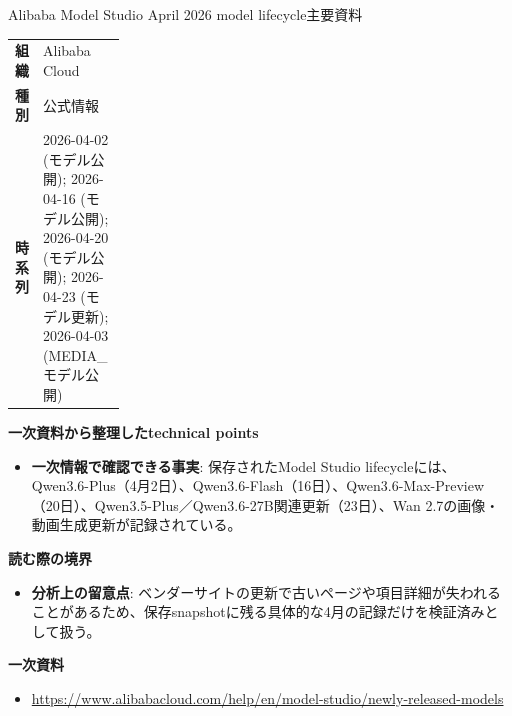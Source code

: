 \begin{technicalnote}{Alibaba Model Studio April 2026 model lifecycle}{主要資料}
\begingroup
\begin{tabularx}{\linewidth}{@{}>{\bfseries}p{0.22\linewidth}X@{}}
組織 & Alibaba Cloud \\
種別 & 公式情報 \\
時系列 & 2026-04-02 (モデル公開); 2026-04-16 (モデル公開); 2026-04-20 (モデル公開); 2026-04-23 (モデル更新); 2026-04-03 (MEDIA\_モデル公開) \\
\end{tabularx}
\smallskip
{\bfseries 一次資料から整理したtechnical points}
\begin{itemize}[leftmargin=1.5em,itemsep=0.35em]
\item \textbf{一次情報で確認できる事実}: 保存されたModel Studio lifecycleには、Qwen3.6-Plus（4月2日）、Qwen3.6-Flash（16日）、Qwen3.6-Max-Preview（20日）、Qwen3.5-Plus／Qwen3.6-27B関連更新（23日）、Wan 2.7の画像・動画生成更新が記録されている。
\end{itemize}
{\bfseries 読む際の境界}
\begin{itemize}[leftmargin=1.5em,itemsep=0.35em]
\item \textbf{分析上の留意点}: ベンダーサイトの更新で古いページや項目詳細が失われることがあるため、保存snapshotに残る具体的な4月の記録だけを検証済みとして扱う。
\end{itemize}
\begin{samepage}
{\bfseries 一次資料}
\begingroup\sloppy
\begin{itemize}[leftmargin=1.5em,itemsep=0.25em]
\item {\scriptsize\url{https://www.alibabacloud.com/help/en/model-studio/newly-released-models}}
\end{itemize}
\endgroup
\end{samepage}
\endgroup
\end{technicalnote}
\medskip

